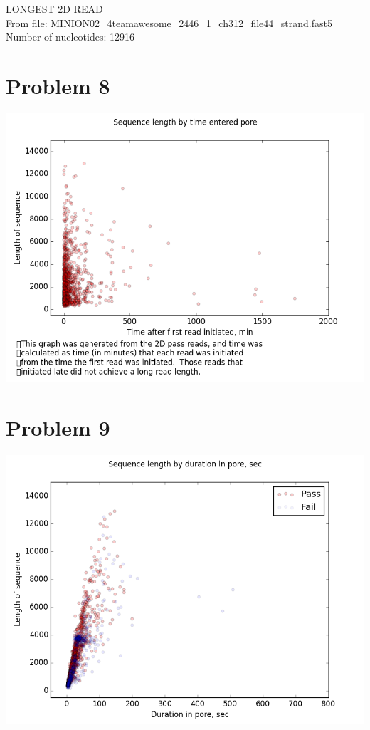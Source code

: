 \documentclass[11pt]{article}
\begin{document}
LONGEST 2D READ\\
From file: MINION02\_4teamawesome\_2446\_1\_ch312\_file44\_strand.fast5\\
Number of nucleotides: 12916\\
\section*{Problem 8}
\includegraphics[width=\textwidth]{q8}
\section*{Problem 9}
\includegraphics[width=\textwidth]{q9}
\end{document}
